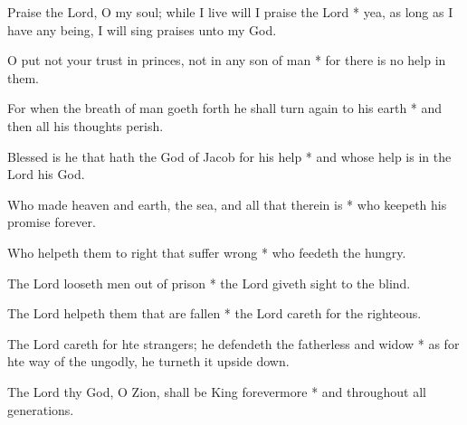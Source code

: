 Praise the Lord, O my soul; while I live will I praise the Lord * yea, as long as I have any being, I will sing praises unto my God.

O put not your trust in princes, not in any son of man * for there is no help in them.
	
For when the breath of man goeth forth he shall turn again to his earth * and then all his thoughts perish.
	
Blessed is he that hath the God of Jacob for his help * and whose help is in the Lord his God.
	
Who made heaven and earth, the sea, and all that therein is * who keepeth his promise forever.
	
Who helpeth them to right that suffer wrong * who feedeth the hungry.
	
The Lord looseth men out of prison * the Lord giveth sight to the blind.
	
The Lord helpeth them that are fallen * the Lord careth for the righteous.
	
The Lord careth for hte strangers; he defendeth the fatherless and widow * as for hte way of the ungodly, he turneth it upside down.
	
The Lord thy God, O Zion, shall be King forevermore * and throughout all generations.